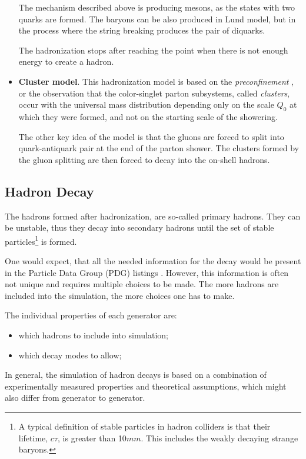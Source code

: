\begin{itemize}
 The mechanism described above is producing mesons, as the states with two quarks are formed. The baryons can be also produced
 in Lund model, but in the process where the string breaking produces the pair of diquarks.
 
 The hadronization stops after reaching the point when there is not enough energy to create a hadron.
 
 \item \textbf{Cluster model}. This hadronization model is based on the \textit{preconfinement} \cite{Amati:1979fg}, or the
 observation that the color-singlet parton subsystems, called \textit{clusters}, occur with the universal mass distribution
 depending only on the scale $Q_{0}$ at which they were formed, and not on the starting scale of the showering.
 
 The other key idea of the model is that the gluons are forced to split into quark-antiquark pair at the end of the parton shower.
 The clusters formed by the gluon splitting are then forced to decay into the on-shell hadrons.
 
\end{itemize}

\subsection{Hadron Decay}

The hadrons formed after hadronization, are so-called primary hadrons. They can be unstable, thus they decay into secondary hadrons
until the set of stable particles\footnote{A typical definition of stable particles in hadron colliders is that their
lifetime, $c\tau$, is greater than 10$mm$. This includes the weakly decaying strange baryons.} is formed.

One would expect, that all the needed information for the decay would be present in the Particle Data Group (PDG) listings \cite{PDG-2012}.
However, this information is often not unique and requires multiple choices to be made. The more hadrons are included into the simulation,
the more choices one has to make.

The individual properties of each generator are:

\begin{itemize}
 \item which hadrons to include into simulation;
 \item which decay modes to allow;
\end{itemize}

In general, the simulation of hadron decays is based on a combination of experimentally measured properties and theoretical assumptions, which
might also differ from generator to generator.

